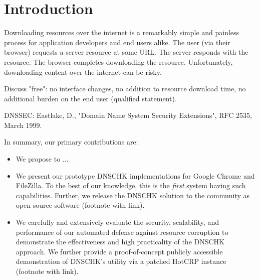 \section{Introduction} \label{sec:introduction}

Downloading resources over the internet is a remarkably simple and painless
process for application developers and end users alike. The user (via their
browser) requests a server resource at some URL. The server responds with the
resource. The browser completes downloading the resource. Unfortunately,
downloading content over the internet can be risky.


Discuss "free": no interface changes, no addition to resource download time, no
additional burden on the end user (qualified statement).

DNSSEC: Eastlake, D., "Domain Name System Security Extensions", RFC 2535, March
1999.

In summary, our primary contributions are:

\begin{itemize}

  \item We propose to  ...

  \item We present our prototype DNSCHK implementations for Google Chrome and
  FileZilla. To the best of our knowledge, this is the \emph{first} system
  having such capabilities. Further, we release the DNSCHK solution to the
  community as open source software (footnote with link).

  \item We carefully and extensively evaluate the security, scalability, and
  performance of our automated defense against resource corruption to
  demonstrate the effectiveness and high practicality of the DNSCHK approach. We
  further provide a proof-of-concept publicly accessible demonstration of
  DNSCHK's utility via a patched HotCRP instance (footnote with link).

\end{itemize}
